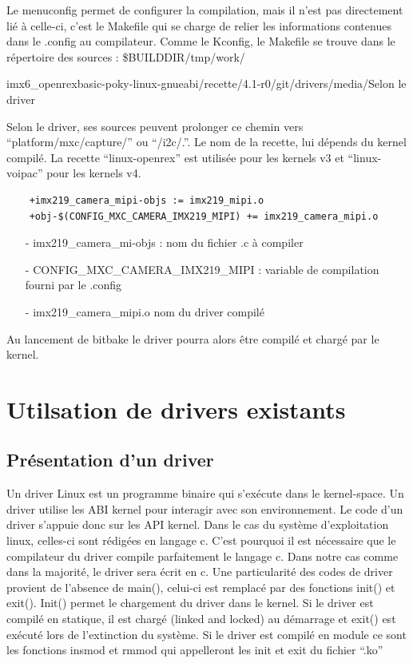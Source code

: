 Le menuconfig permet de configurer la compilation, mais il n’est pas directement lié à
celle-ci, c’est le Makefile qui se charge de relier les informations contenues dans le .config
au compilateur. Comme le Kconfig, le Makefile se trouve dans le répertoire des sources :
\$BUILDDIR/tmp/work/{imx6\_openrexbasic-poky-linux-gnueabi/{recette}/4.1-r0/git/drivers/media/{Selon le driver}

Selon le driver, ses sources peuvent prolonger ce chemin vers “platform/mxc/capture/” ou
“/i2c/.”. Le nom de la recette, lui dépends du kernel compilé. La recette “linux-openrex” est
utilisée pour les kernels v3 et “linux-voipac” pour les kernels v4.

\begin{lstlisting}
    +imx219_camera_mipi-objs := imx219_mipi.o
    +obj-$(CONFIG_MXC_CAMERA_IMX219_MIPI) += imx219_camera_mipi.o
\end{lstlisting}

\begin{itemize}
    \item[-] imx219\_camera\_mi-objs : nom du fichier .c à compiler
    \item[-] CONFIG\_MXC\_CAMERA\_IMX219\_MIPI : variable de compilation fourni par le .config
    \item[-] imx219\_camera\_mipi.o nom du driver compilé
\end{itemize}

Au lancement de bitbake le driver pourra alors être compilé et chargé par le kernel.

\section{Utilsation de drivers existants}

\subsection{Présentation d'un driver}

Un driver Linux est un programme binaire qui s’exécute dans le kernel-space. Un driver
utilise les ABI kernel pour interagir avec son environnement. Le code d’un driver s’appuie
donc sur les API kernel. Dans le cas du système d’exploitation linux, celles-ci sont
rédigées en langage c. C’est pourquoi il est nécessaire que le compilateur du driver
compile parfaitement le langage c. Dans notre cas comme dans la majorité, le driver sera
écrit en c. Une particularité des codes de driver provient de l’absence de main(), celui-ci
est remplacé par des fonctions init() et exit(). Init() permet le chargement du driver dans le
kernel. Si le driver est compilé en statique, il est chargé (linked and locked) au démarrage
et exit() est exécuté lors de l’extinction du système. Si le driver est compilé en module ce
sont les fonctions insmod et rmmod qui appelleront les init et exit du fichier “.ko”

}
